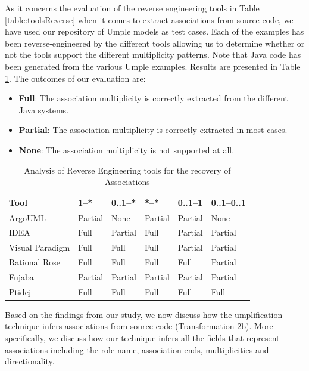 As it concerns the evaluation of the reverse engineering tools in Table \ref{table:toolsReverse} when it comes to extract associations from source code, we have used our repository of Umple models\cite{umpleexamples} as test cases.  Each of the examples has been reverse-engineered by the different tools allowing us to determine whether or not the tools support the different multiplicity patterns. Note that Java code has been generated from the various Umple examples. Results are presented in Table \ref{table:analyzeAssocsSecondPart}. The outcomes of our evaluation are:

\begin{itemize}
 \item \textbf{Full}: The association multiplicity is correctly extracted from the different Java systems.
 \item \textbf{Partial}: The association multiplicity is correctly extracted in most cases.
 \item \textbf{None}: The association multiplicity is not supported at all.
\end{itemize} 

\begin{table} [h]
\caption{Analysis of Reverse Engineering tools for the recovery of Associations}
\label{table:analyzeAssocsSecondPart}
\centering
\begin{tabular}{llllll}
\toprule
\rowcolor[HTML]{BBDAFF}
\textbf{Tool}   & \textbf{1--*}    & \textbf{0..1--*}   &  \textbf{*--*}   &  \textbf{0..1--1} & \textbf{0..1--0..1} \\ 
\hline
ArgoUML & Partial & None & Partial & Partial & None \\ 
IDEA & Full & Partial & Full & Partial & Partial \\ 
Visual Paradigm  & Full & Full & Full & Partial & Partial \\ 
Rational Rose & Full & Full & Full & Full & Partial \\ 
Fujaba  & Partial & Partial & Partial & Partial & Partial \\ 
Ptidej  & Full & Full & Full & Full & Full \\ 
\hline
\end{tabular}
\end{table}

Based on the findings from our study, we now discuss how the umplification technique infers associations from source code (Transformation 2b). More specifically, we discuss how our technique infers all the fields that represent associations including the role name, association ends, multiplicities and directionality.

